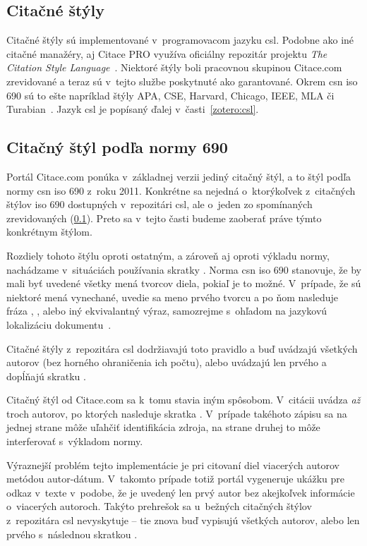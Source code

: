 \documentclass[
  color,
  table,
  nolof,
  oneside,
]{fithesis3}
\begin{document}
\subsection{Citačné štýly}\label{citace:styles}

Citačné štýly sú implementované v~programovacom jazyku \gls{csl}. Podobne ako iné citačné manažéry, aj Citace PRO využíva oficiálny repozitár projektu \emph{The Citation Style Language}~\cite{csl:home}. Niektoré štýly boli pracovnou skupinou Citace.com zrevidované a teraz sú v~tejto službe poskytnuté ako garantované. Okrem \gls{csn} \gls{iso} 690 sú to ešte napríklad štýly APA, CSE, Harvard, Chicago, IEEE, MLA či Turabian~\cite{Krcal2013}. Jazyk \gls{csl} je popísaný ďalej v~časti~\ref{zotero:csl}.

\subsection{Citačný štýl podľa normy  690}

Portál Citace.com ponúka v~základnej verzii jediný citačný štýl, a to štýl podľa normy \gls{csn} \gls{iso} 690 z~roku 2011. Konkrétne sa nejedná o~ktorýkoľvek z~citačných štýlov \gls{iso} 690 dostupných v~repozitári \gls{csl}, ale o~jeden zo spomínaných zrevidovaných (\ref{citace:styles}). Preto sa v~tejto časti budeme zaoberať práve týmto konkrétnym štýlom.

Rozdiely tohoto štýlu oproti ostatným, a zároveň aj oproti výkladu normy, nachádzame v~situáciách používania skratky . Norma \gls{csn} \gls{iso} 690 stanovuje, že by mali byť uvedené všetky mená tvorcov diela, pokiaľ je to možné. V~prípade, že sú niektoré mená vynechané, uvedie sa meno prvého tvorcu a po ňom nasleduje fráza , ,  alebo iný ekvivalantný výraz, samozrejme s~ohľadom na jazykovú lokalizáciu dokumentu~\cite{csn:iso690:2011}.

Citačné štýly z~repozitára \gls{csl} dodržiavajú toto pravidlo a buď uvádzajú všetkých autorov (bez horného ohraničenia ich počtu), alebo uvádzajú len prvého a dopĺňajú skratku .

Citačný štýl od Citace.com sa k~tomu stavia iným spôsobom. V~citácii uvádza \emph{až} troch autorov, po ktorých nasleduje skratka . V~prípade takéhoto zápisu sa na jednej strane môže uľahčiť identifikácia zdroja, na strane druhej to môže interferovať s~výkladom normy.

Výraznejší problém tejto implementácie je pri citovaní diel viacerých autorov metódou autor-dátum. V~takomto prípade totiž portál vygeneruje ukážku pre odkaz v~texte v~podobe, že je uvedený len prvý autor bez akejkoľvek informácie o~viacerých autoroch. Takýto prehrešok sa u~bežných citačných štýlov z~repozitára \gls{csl} nevyskytuje -- tie znova buď vypisujú všetkých autorov, alebo len prvého s~následnou skratkou .
	
\end{document}
